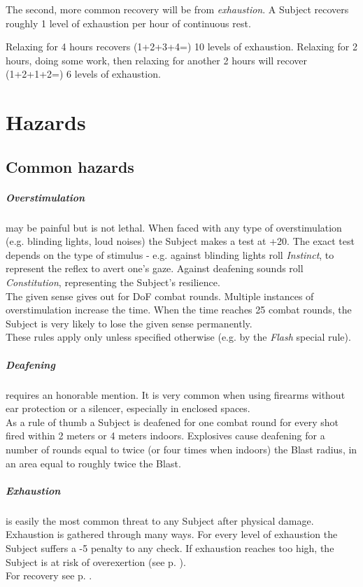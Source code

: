 \documentclass[11pt,a4paper,openany,dvipsnames]{book}
\begin{document}
	The second, more common recovery will be from \emph{exhaustion}.
	A Subject recovers roughly 1 level of exhaustion per hour of continuous rest.
	\begin{exampleblock}
		Relaxing for 4 hours recovers (1+2+3+4=) 10 levels of exhaustion.
		Relaxing for 2 hours,
			doing some work,
			then relaxing for another 2 hours
			will recover (1+2+1+2=) 6 levels of exhaustion.
	\end{exampleblock}

	\chapter{Hazards}
	\section{Common hazards}
	\paragraph{Overstimulation} may be painful but is not lethal.
	When faced with any type of overstimulation
		(e.g. blinding lights, loud noises) the Subject makes a test at +20.
	The exact test depends on the type of stimulus
		- e.g. against blinding lights roll \emph{Instinct},
		to represent the reflex to avert one's gaze.
		Against deafening sounds roll \emph{Constitution},
		representing the Subject's resilience.
	\\%
	The given sense gives out for DoF combat rounds.
	Multiple instances of overstimulation increase the time.
	When the time reaches 25 combat rounds,
		the Subject is very likely to lose the given sense permanently.
	\\%
	These rules apply only unless specified otherwise (e.g. by the \emph{Flash} special rule).
	\paragraph{Deafening} requires an honorable mention.
	It is very common when using firearms without ear protection or a silencer, especially in enclosed spaces.
	\\%
	As a rule of thumb a Subject is deafened for one combat round for every shot fired within 2 meters or 4 meters indoors.
	Explosives cause deafening for a number of rounds equal to twice (or four times when indoors) the Blast radius,
	in an area equal to roughly twice the Blast.
	\paragraph{Exhaustion} is easily the most common threat to any Subject after physical damage.
	Exhaustion is gathered through many ways.
	For every level of exhaustion the Subject suffers a -5 penalty to any check.
	If exhaustion reaches too high,
		the Subject is at risk of overexertion (see p. \pageref{sec:lethality}).
	\\%
	For recovery see p. \pageref{sec:recovery}.
\end{document}
